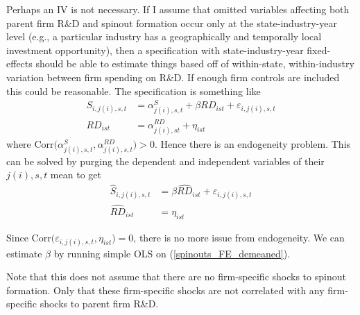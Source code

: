 \documentclass[12pt,english]{article}
\theoremstyle{remark}
\begin{document}
Perhaps an IV is not necessary. If I assume that omitted variables affecting both parent firm R\&D and spinout formation occur only at the state-industry-year level (e.g., a particular industry has a geographically and temporally local investment opportunity), then a specification with state-industry-year fixed-effects should be able to estimate things based off of within-state, within-industry variation between firm spending on R\&D. If enough firm controls are included this could be reasonable. The specification is something like 
\begin{align}
	S_{i,j(i),s,t} &= \alpha_{j(i),s,t}^S + \beta RD_{ist} + \varepsilon_{i,j(i),s,t} \\
	RD_{ist} &= \alpha_{j(i),st}^{RD} + \eta_{ist}
\end{align}
where $\mathrm{Corr} \Big( \alpha_{j(i),s,t}^S, \alpha_{j(i),s,t}^{RD} \Big) > 0 $. Hence there is an endogeneity problem. This can be solved by purging the dependent and independent variables of their $j(i),s,t$ mean to get
\begin{align}
	\hat{S}_{i,j(i),s,t} &= \beta \hat{RD}_{ist} + \varepsilon_{i,j(i),s,t} \label{spinouts_FE_demeaned} \\
	\hat{RD}_{ist} &= \eta_{ist} 
\end{align}

Since $\mathrm{Corr} \Big( \varepsilon_{i,j(i),s,t}, \eta_{ist} \Big) = 0$, there is no more issue from endogeneity. We can estimate $\beta$ by running simple OLS on (\ref{spinouts_FE_demeaned}). 

Note that this does not assume that there are no firm-specific shocks to spinout formation. Only that these firm-specific shocks are not correlated with any firm-specific shocks to parent firm R\&D. 
\end{document}
